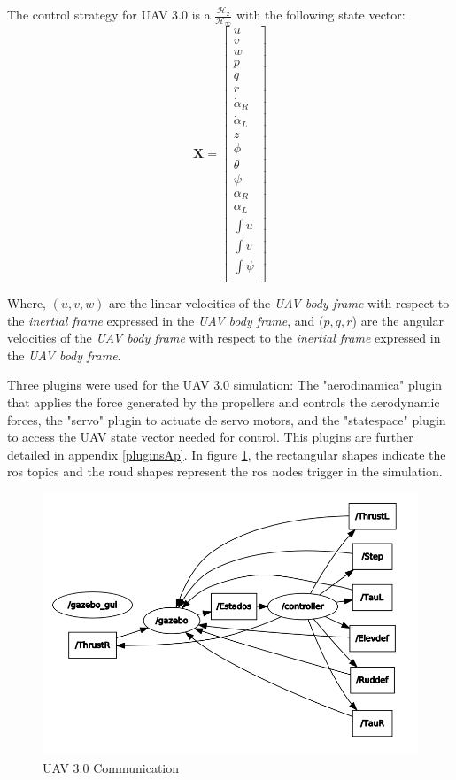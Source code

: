 The control strategy for UAV 3.0 is a $\frac{\mathcal{H}_2}{\mathcal{H_\infty}}$ with the following state vector:
\begin{equation*}
\bm{X} = \begin{bmatrix}
u \\
v \\
w \\
p \\
q \\
r\\
\dot\alpha_R \\
\dot\alpha_L \\
z \\
\phi \\
\theta \\
\psi \\
\alpha_R \\
\alpha_L \\
\int{u} \\
\int{v} \\
\int{\psi} \\         
\end{bmatrix}
\end{equation*} 

Where, $(u,v,w)$ are the linear velocities of the \textit{UAV body frame} with respect to the \textit{inertial frame} expressed in the \textit{UAV body frame}, and ($p,q,r$) are the angular velocities of the \textit{UAV body frame} with respect to the \textit{inertial frame} expressed in the \textit{UAV body frame}.

Three plugins were used for the UAV 3.0 simulation: The "aerodinamica" plugin that applies the force generated by the propellers and controls the aerodynamic forces, the "servo" plugin to actuate de servo motors, and the "statespace" plugin to access the UAV state vector needed for control. This plugins are further detailed in appendix \ref{pluginsAp}. In figure \ref{v3graph}, the rectangular shapes indicate the ros topics and the roud shapes represent the ros nodes trigger in the simulation.
 


\begin{figure}[!ht]
	\centering
	\includegraphics[width=350pt]{figuras/v3graph.png}
	\caption{UAV 3.0 Communication}
	\label{v3graph}
\end{figure}


